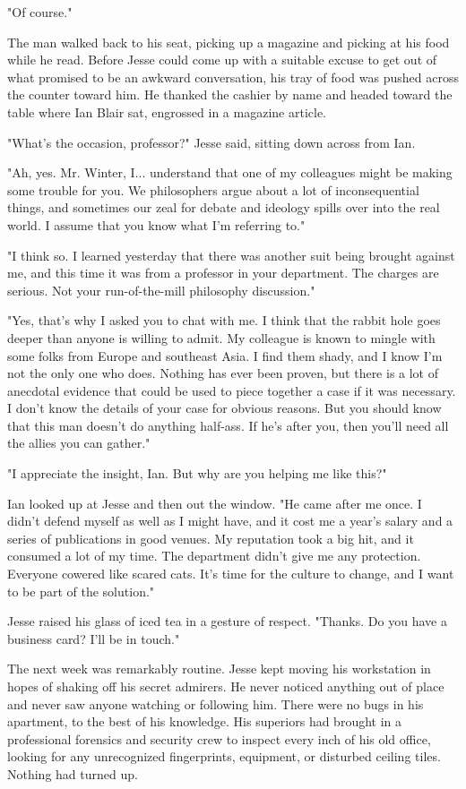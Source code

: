 "Of course."

The man walked back to his seat, picking up a magazine and picking at his food while he read.  Before Jesse could come up with a suitable excuse to get out of what promised to be an awkward conversation, his tray of food was pushed across the counter toward him.  He thanked the cashier by name and headed toward the table where Ian Blair sat, engrossed in a magazine article.

"What's the occasion, professor?" Jesse said, sitting down across from Ian.

"Ah, yes.  Mr. Winter, I... understand that one of my colleagues might be making some trouble for you.  We philosophers argue about a lot of inconsequential things, and sometimes our zeal for debate and ideology spills over into the real world.  I assume that you know what I'm referring to."

"I think so.  I learned yesterday that there was another suit being brought against me, and this time it was from a professor in your department.  The charges are serious.  Not your run-of-the-mill philosophy discussion."

"Yes, that's why I asked you to chat with me.  I think that the rabbit hole goes deeper than anyone is willing to admit.  My colleague is known to mingle with some folks from Europe and southeast Asia.  I find them shady, and I know I'm not the only one who does.  Nothing has ever been proven, but there is a lot of anecdotal evidence that could be used to piece together a case if it was necessary.  I don't know the details of your case for obvious reasons.  But you should know that this man doesn't do anything half-ass.  If he's after you, then you'll need all the allies you can gather."

"I appreciate the insight, Ian.  But why are you helping me like this?"

Ian looked up at Jesse and then out the window.  "He came after me once.  I didn't defend myself as well as I might have, and it cost me a year's salary and a series of publications in good venues.  My reputation took a big hit, and it consumed a lot of my time.  The department didn't give me any protection.  Everyone cowered like scared cats.  It's time for the culture to change, and I want to be part of the solution."

Jesse raised his glass of iced tea in a gesture of respect.  "Thanks.  Do you have a business card?  I'll be in touch."

									
The next week was remarkably routine.  Jesse kept moving his workstation in hopes of shaking off his secret admirers.  He never noticed anything out of place and never saw anyone watching or following him.  There were no bugs in his apartment, to the best of his knowledge.  His superiors had brought in a professional forensics and security crew to inspect every inch of his old office, looking for any unrecognized fingerprints, equipment, or disturbed ceiling tiles.  Nothing had turned up.

